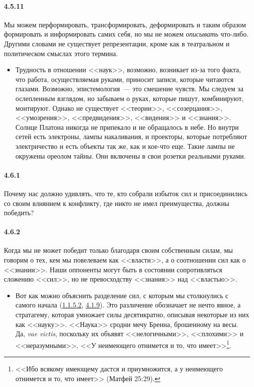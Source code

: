 \paragraph{4.5.11}\hypertarget{par:4.5.11}{}Мы можем перформировать, трансформировать, деформировать и таким образом формировать и информировать самих себя, но мы не можем {\itshape описывать} что-либо. Другими словами не существует репрезентации, кроме как в театральном и политическом смыслах этого термина. 
	\begin{itemize}
	\item 
	Трудность в отношении <<наук>>, возможно, возникает из-за того факта, что работа, осуществляемая руками, приносит записи, которые читаются глазами. Возможно, эпистемология~--- это смешение чувств. Мы следуем за ослепленным взглядом, но забываем о руках, которые пишут, комбинируют, монтируют. Однако не существует <<теории>>, <<созерцания>>, <<умозрения>>, <<предвидения>>, <<видения>> и <<знания>>. Солнце Платона никогда не припекало и не обращалось в небе. Но внутри сетей есть электроны, лампы накаливания, и проекторы, которые потребляют электричество и есть объекты так же, как и кое-что еще. Такие лампы не окружены ореолом тайны. Они включены в свои розетки реальными руками.
	\end{itemize}	


\paragraph{4.6.1}\hypertarget{par:4.6.1}{} Почему нас должно удивлять, что те, кто собрали избыток сил и присоединились со своим влиянием к конфликту, где никто не имел преимущества, должны победить?


\paragraph{4.6.2}\hypertarget{par:4.6.2}{} Когда мы не может победит только благодаря своим собственным силам, мы говорим о тех, кем мы повелеваем как <<власти>>, а о соотношении сил как о <<знании>>. Наши оппоненты могут быть в состоянии сопротивляться сложению <<сил>>, но не превосходству <<знания>> над <<властью>>.
	\begin{itemize}
	\item 
	Вот как можно объяснить разделение сил, с которым мы столкнулись с самого начала (\hyperlink{par:1.1.5.2}{1.1.5.2}, \hyperlink{par:4.1.9}{4.1.9}). Это различение обозначает не нечто явное, а стратагему, которая умножает силы десятикратно, описывая некоторые из них как <<науку>>. <<Наука>> сродни мечу Бренна, брошенному на весы. Да, {\itshape vae victis}, поскольку их объявят <<нелогичными>>, <<плохими>> и <<неразумными>>. <<У неимеющего отнимется и то, что имеет>>\footnote{<<Ибо всякому имеющему дастся и приумножится, а у неимеющего отнимется и то, что имеет>> (Матфей 25:29).}. 
	\end{itemize}	

